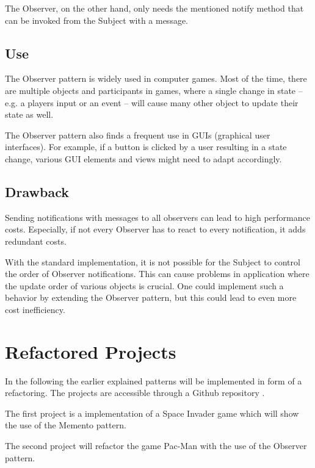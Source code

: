 \documentclass{bioinfo}
\begin{document}
The Observer, on the other hand, only needs the mentioned notify method that can be invoked from the Subject with a message.


\subsection{Use}
The Observer pattern is widely used in computer games. Most of the time, there are multiple objects and participants in games, where a single change in state – e.g. a players input or an event – will cause many other object to update their state as well.

The Observer pattern also finds a frequent use in GUIs (graphical user interfaces). For example, if a button is clicked by a user resulting in a state change, various GUI elements and views might need to adapt accordingly. \cite{wiki:observer}

\subsection{Drawback}
Sending notifications with messages to all observers can lead to high performance costs. Especially, if not every Observer has to react to every notification, it adds redundant costs.

With the standard implementation, it is not possible for the Subject to control the order of Observer notifications. This can cause problems in application where the update order of various objects is crucial. One could implement such a behavior by extending the Observer pattern, but this could lead to even more cost inefficiency.


\section{Refactored Projects}
In the following the earlier explained patterns will be implemented in form of a refactoring. The projects are accessible through a Github repository \cite{github}.

The first project is a implementation of a Space Invader game which will show the use of the Memento pattern.

The second project will refactor the game Pac-Man with the use of the Observer pattern.
\end{document}
